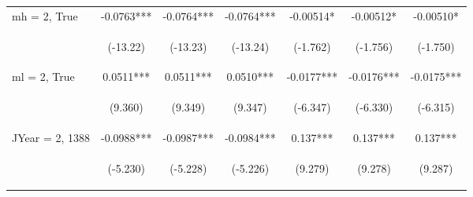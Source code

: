 \documentclass[]{article}
\begin{document}
\begin{center}
\begin{tabular}{lcccccc}
mh = 2, True & -0.0763*** & -0.0764*** & -0.0764*** & -0.00514* & -0.00512* & -0.00510* \\
\vspace{4pt} & \begin{footnotesize}(-13.22)\end{footnotesize} & \begin{footnotesize}(-13.23)\end{footnotesize} & \begin{footnotesize}(-13.24)\end{footnotesize} & \begin{footnotesize}(-1.762)\end{footnotesize} & \begin{footnotesize}(-1.756)\end{footnotesize} & \begin{footnotesize}(-1.750)\end{footnotesize} \\
ml = 2, True & 0.0511*** & 0.0511*** & 0.0510*** & -0.0177*** & -0.0176*** & -0.0175*** \\
\vspace{4pt} & \begin{footnotesize}(9.360)\end{footnotesize} & \begin{footnotesize}(9.349)\end{footnotesize} & \begin{footnotesize}(9.347)\end{footnotesize} & \begin{footnotesize}(-6.347)\end{footnotesize} & \begin{footnotesize}(-6.330)\end{footnotesize} & \begin{footnotesize}(-6.315)\end{footnotesize} \\
JYear = 2, 1388 & -0.0988*** & -0.0987*** & -0.0984*** & 0.137*** & 0.137*** & 0.137*** \\
\vspace{4pt} & \begin{footnotesize}(-5.230)\end{footnotesize} & \begin{footnotesize}(-5.228)\end{footnotesize} & \begin{footnotesize}(-5.226)\end{footnotesize} & \begin{footnotesize}(9.279)\end{footnotesize} & \begin{footnotesize}(9.278)\end{footnotesize} & \begin{footnotesize}(9.287)\end{footnotesize} \\

\end{tabular}
\end{center}
\end{document}
